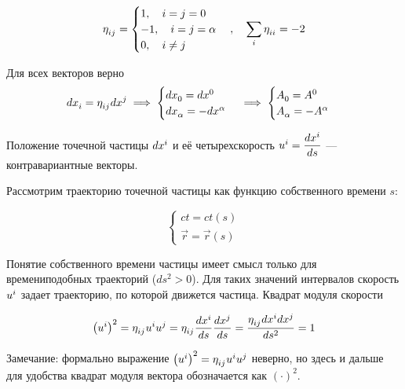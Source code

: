 \documentclass{article}
\begin{document}
\begin{equation*}
    \tensor{\eta}{_i_j}=
    \begin{cases}
    1,\quad i=j=0\\
    -1,\quad i=j=\alpha\\
    0,\quad i\ne j
    \end{cases},\quad\sum_i\tensor{\eta}{_i_i}=-2
\end{equation*}

Для всех векторов верно
\begin{equation*}
    d\tensor{x}{_i}=\tensor{\eta}{_i_j}d\tensor{x}{^j}\implies
    \begin{cases}
    d\tensor{x}{_0}=d\tensor{x}{^0}\\
    d\tensor{x}{_\alpha}=-d\tensor{x}{^\alpha}
    \end{cases}
    \implies
    \begin{cases}
    \tensor{A}{_0}=\tensor{A}{^0}\\
    \tensor{A}{_\alpha}=-\tensor{A}{^\alpha}
    \end{cases}
\end{equation*}

Положение точечной частицы $d\tensor{x}{^i}$ и её четырехскорость $\tensor{u}{^i}=\dfrac{d\tensor{x}{^i}}{ds}$ --- контравариантные векторы.

Рассмотрим траекторию точечной частицы как функцию собственного времени $s$:

\begin{equation*}
    \begin{cases}
    ct=ct(s)\\
    \vec{r}=\vec{r}(s)
    \end{cases}
\end{equation*}

Понятие собственного времени частицы имеет смысл только для времениподобных траекторий ($ds^2>0$). Для таких значений интервалов скорость $\tensor{u}{^i}$ задает траекторию, по которой движется частица. Квадрат модуля скорости

\begin{equation}\label{eq:velocity_sq}
    \left(\tensor{u}{^i}\right)^2=\tensor{\eta}{_i_j}\tensor{u}{^i}\tensor{u}{^j}=\tensor{\eta}{_i_j}\dfrac{d\tensor{x}{^i}}{ds}\dfrac{d\tensor{x}{^j}}{ds}=\dfrac{\tensor{\eta}{_i_j}d\tensor{x}{^i}d\tensor{x}{^j}}{ds^2}=1
\end{equation}

Замечание: формально выражение $ \left(\tensor{u}{^i}\right)^2=\tensor{\eta}{_i_j}\tensor{u}{^i}\tensor{u}{^j}$ неверно, но здесь и дальше для удобства квадрат модуля вектора обозначается как $\left(\cdot\right)^2$.
\end{document}
